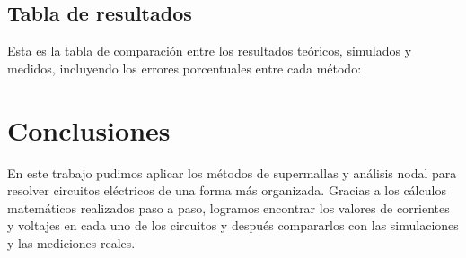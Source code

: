 \documentclass[conference]{IEEEtran}
\begin{document}
\subsection{Tabla de resultados}
Esta es la tabla de comparación entre los resultados teóricos, simulados y medidos, incluyendo los errores porcentuales entre cada método:
\begin{table}[h]
\centering
\caption{Comparación entre resultados teóricos, simulados y medidos}
\end{table}

\section{Conclusiones}

En este trabajo pudimos aplicar los métodos de supermallas y análisis nodal para resolver circuitos
eléctricos de una forma más organizada. Gracias a los cálculos matemáticos realizados paso a paso,
logramos encontrar los valores de corrientes y voltajes en cada uno de los circuitos y después
compararlos con las simulaciones y las mediciones reales.
\end{document}
